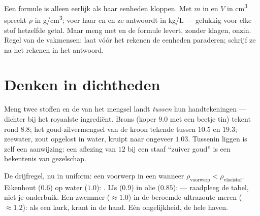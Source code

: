 \begin{remark}\label{rem:g7:volume-mass-density:units}
Een formule is alleen eerlijk als haar eenheden kloppen. Met $m$ in
 en $V$ in \unit{cm^3} spreekt $\rho$ in \unit{g/cm^3}; voer haar
 en  en ze antwoordt in \unit{kg/L} --- gelukkig voor
elke stof hetzelfde getal. Maar meng  met  en de formule
levert, zonder klagen, onzin. Regel van de vakmensen: laat vóór het
rekenen de eenheden paraderen; schrijf ze na het rekenen in het
antwoord.
\end{remark}

\section{Denken in dichtheden}

\begin{example}\label{ex:g7:volume-mass-density:alloys}
Meng twee stoffen en de  van het mengsel landt
\emph{tussen} hun handtekeningen --- dichter bij het royaalste
ingrediënt. Brons (koper $9.0$ met een beetje tin) tekent rond $8.8$;
het goud-zilvermengsel van de kroon tekende tussen $10.5$ en $19.3$;
zeewater, zout opgelost in water, kruipt naar ongeveer $1.03$.
Tussenin liggen is zelf een aanwijzing: een aflezing van $12$ bij een
staaf ``zuiver goud'' is een bekentenis van gezelschap.
\end{example}

\begin{example}\label{ex:g7:volume-mass-density:floating}
De drijfregel, nu in uniform: een voorwerp  in een
 wanneer
$\rho_{\text{voorwerp}} < \rho_{\text{vloeistof}}$. Eikenhout ($0.6$)
op water ($1.0$): . IJs ($0.9$) in olie ($0.85$):  ---
raadpleeg de tabel, niet je onderbuik. Een zwemmer ($\approx 1.0$) in
de beroemde ultrazoute meren ($\approx 1.2$):  als een kurk,
krant in de hand. Eén ongelijkheid, de hele haven.
\end{example}

